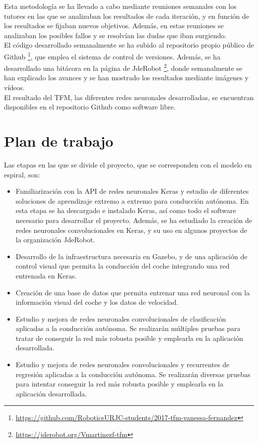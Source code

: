 Esta metodología se ha llevado a cabo mediante reuniones semanales con los tutores en las que se analizaban los resultados de cada iteración, y en función de los resultados se fijaban nuevos objetivos. Además, en estas reuniones se analizaban los posibles fallos y se resolvían las dudas que iban surgiendo.\\


El código desarrollado semanalmente se ha subido al repositorio propio público de Github \footnote{\url{https://github.com/RoboticsURJC-students/2017-tfm-vanessa-fernandez}}, que emplea el sistema de control de versiones. Además, se ha desarrollado una bitácora en la página de JdeRobot \footnote{\url{https://jderobot.org/Vmartinezf-tfm}}, donde semanalmente se han explicado los avances y se han mostrado los resultados mediante imágenes y vídeos.\\

El resultado del TFM, las diferentes redes neuronales desarrolladas, se encuentran disponibles en el repositorio Github como software libre.



\section{Plan de trabajo}

Las etapas en las que se divide el proyecto, que se corresponden con el modelo en espiral, son:

\begin{itemize}
    \item Familiarización con la API de redes neuronales Keras y estudio de diferentes soluciones de aprendizaje extremo a extremo para conducción autónoma. En esta etapa se ha descargado e instalado Keras, así como todo el software necesario para desarrollar el proyecto. Además, se ha estudiado la creación de redes neuronales convolucionales en Keras, y su uso en algunos proyectos de la organización JdeRobot.
    
    \item Desarrollo de la infraestructura necesaria en Gazebo, y de una aplicación de control visual que permita la conducción del coche integrando una red entrenada en Keras.
    
    \item Creación de una base de datos que permita entrenar una red neuronal con la información visual del coche y los datos de velocidad.
    
    \item Estudio y mejora de redes neuronales convolucionales de clasificación aplicadas a la conducción autónoma. Se realizarán múltiples pruebas para tratar de conseguir la red más robusta posible y emplearla en la aplicación desarrollada.
    
    \item Estudio y mejora de redes neuronales convolucionales y recurrentes de regresión aplicadas a la conducción autónoma. Se realizarán diversas pruebas para intentar conseguir la red más robusta posible y emplearla en la aplicación desarrollada.
\end{itemize}

